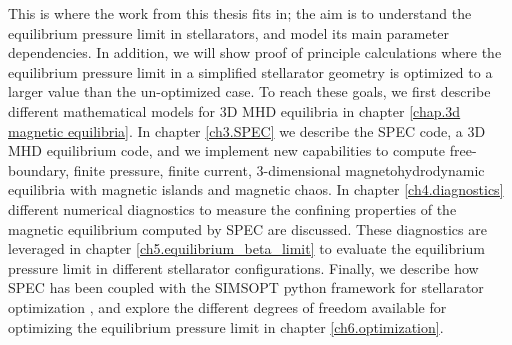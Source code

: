 \documentclass[my_thesis.tex]{subfiles}
\begin{document}
This is where the work from this thesis fits in; the aim  is to  understand the equilibrium pressure limit in stellarators, and model its main parameter dependencies. In addition, we will show proof of principle calculations where the equilibrium pressure limit in a simplified stellarator geometry is optimized to a larger value than the un-optimized case. To reach these goals, we first describe different mathematical models for 3D MHD equilibria in chapter \ref{chap.3d magnetic equilibria}. In chapter \ref{ch3.SPEC} we describe the \ac{SPEC} code, a 3D MHD equilibrium code, and we implement new capabilities to compute free-boundary, finite pressure, finite current, 3-dimensional magnetohydrodynamic equilibria with magnetic islands and magnetic chaos. In chapter \ref{ch4.diagnostics} different numerical diagnostics to measure the confining properties of the magnetic equilibrium computed by SPEC are discussed. These diagnostics are leveraged in chapter \ref{ch5.equilibrium_beta_limit} to evaluate the equilibrium pressure limit in different stellarator configurations. Finally, we describe how \ac{SPEC} has been coupled with the SIMSOPT python framework for stellarator optimization \citep{Landreman2021b}, and explore the different degrees of freedom available for optimizing the equilibrium pressure limit in chapter \ref{ch6.optimization}.


\end{document}
